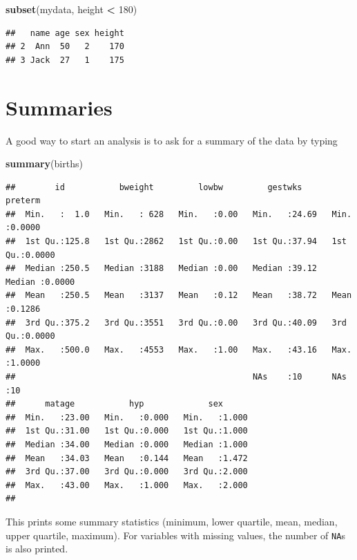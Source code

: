 \documentclass[
]{book}
\newenvironment{Shaded}{\begin{snugshade}}{\end{snugshade}}
\newcommand{\DecValTok}[1]{\textcolor[rgb]{0.00,0.00,0.81}{#1}}
\newcommand{\FunctionTok}[1]{\textcolor[rgb]{0.13,0.29,0.53}{\textbf{#1}}}
\newcommand{\NormalTok}[1]{#1}
\newcommand{\SpecialCharTok}[1]{\textcolor[rgb]{0.81,0.36,0.00}{\textbf{#1}}}
\theoremstyle{definition}
\theoremstyle{definition}
\theoremstyle{definition}
\theoremstyle{definition}
\theoremstyle{remark}
\begin{document}
\begin{Shaded}
\begin{Highlighting}[]
\FunctionTok{subset}\NormalTok{(mydata, height }\SpecialCharTok{\textless{}} \DecValTok{180}\NormalTok{)}
\end{Highlighting}
\end{Shaded}

\begin{verbatim}
##   name age sex height
## 2  Ann  50   2    170
## 3 Jack  27   1    175
\end{verbatim}

\section{Summaries}\label{summaries}

A good way to start an analysis is to ask for a
summary of the data by typing

\begin{Shaded}
\begin{Highlighting}[]
\FunctionTok{summary}\NormalTok{(births)}
\end{Highlighting}
\end{Shaded}

\begin{verbatim}
##        id           bweight         lowbw         gestwks         preterm      
##  Min.   :  1.0   Min.   : 628   Min.   :0.00   Min.   :24.69   Min.   :0.0000  
##  1st Qu.:125.8   1st Qu.:2862   1st Qu.:0.00   1st Qu.:37.94   1st Qu.:0.0000  
##  Median :250.5   Median :3188   Median :0.00   Median :39.12   Median :0.0000  
##  Mean   :250.5   Mean   :3137   Mean   :0.12   Mean   :38.72   Mean   :0.1286  
##  3rd Qu.:375.2   3rd Qu.:3551   3rd Qu.:0.00   3rd Qu.:40.09   3rd Qu.:0.0000  
##  Max.   :500.0   Max.   :4553   Max.   :1.00   Max.   :43.16   Max.   :1.0000  
##                                                NAs    :10      NAs    :10      
##      matage           hyp             sex       
##  Min.   :23.00   Min.   :0.000   Min.   :1.000  
##  1st Qu.:31.00   1st Qu.:0.000   1st Qu.:1.000  
##  Median :34.00   Median :0.000   Median :1.000  
##  Mean   :34.03   Mean   :0.144   Mean   :1.472  
##  3rd Qu.:37.00   3rd Qu.:0.000   3rd Qu.:2.000  
##  Max.   :43.00   Max.   :1.000   Max.   :2.000  
## 
\end{verbatim}

This prints some summary statistics (minimum, lower quartile, mean, median,
upper quartile, maximum). For variables with missing values, the number
of \texttt{NA}s is also printed.
\end{document}
